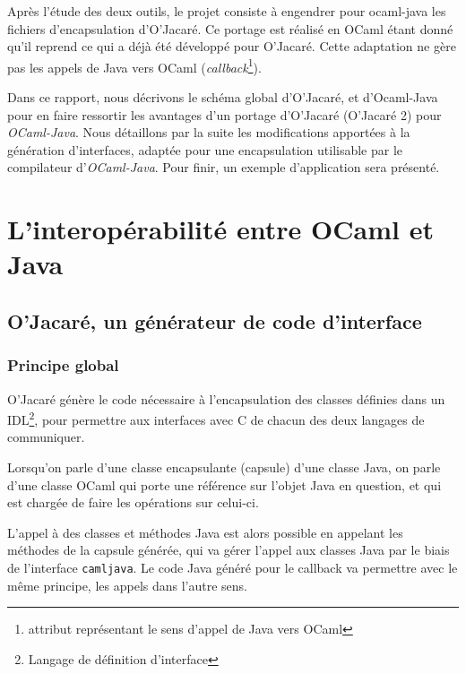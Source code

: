 \documentclass[a4paper, 11pt]{article}
\newcommand{\camljava}{{\tt{camljava}}}
\begin{document}
Après l’étude des deux outils, le projet consiste à engendrer pour
ocaml-java les fichiers d’encapsulation d'O’Jacaré. Ce
portage est réalisé en OCaml étant donné qu'il reprend ce qui
a déjà été développé pour O’Jacaré. Cette adaptation ne gère pas les appels de Java vers OCaml (\emph{callback}\footnote{attribut représentant le sens d'appel de Java vers OCaml}).
\newline

Dans ce rapport, nous décrivons le schéma global d'O'Jacaré, et d'Ocaml-Java
pour en faire ressortir les avantages d'un portage d'O'Jacaré (O'Jacaré 2) pour \emph{OCaml-Java}.
Nous détaillons par la suite les modifications apportées à la
génération d'interfaces, adaptée pour une encapsulation utilisable par
le compilateur d'\emph{OCaml-Java}.
Pour finir, un exemple d'application sera présenté.
\newpage









\section{L'interopérabilité entre OCaml et Java}


\subsection{O'Jacaré, un générateur de code d'interface}

\subsubsection{Principe global}
O'Jacaré génère le code nécessaire à l'encapsulation des classes
définies dans un IDL\footnote{Langage de définition d'interface}, pour permettre aux interfaces avec C de chacun des deux langages de communiquer.

Lorsqu'on parle d'une classe encapsulante (capsule) d'une classe Java, 
on parle d'une classe OCaml qui porte une référence sur l'objet Java en question,
et qui est chargée de faire les opérations sur celui-ci.

L'appel à des classes et méthodes Java est alors possible en appelant
les méthodes de la capsule générée, qui va gérer l'appel aux classes
Java par le biais de l'interface \camljava.
Le code Java généré pour le callback va permettre avec le même
principe, les appels dans l'autre sens.
\end{document}
